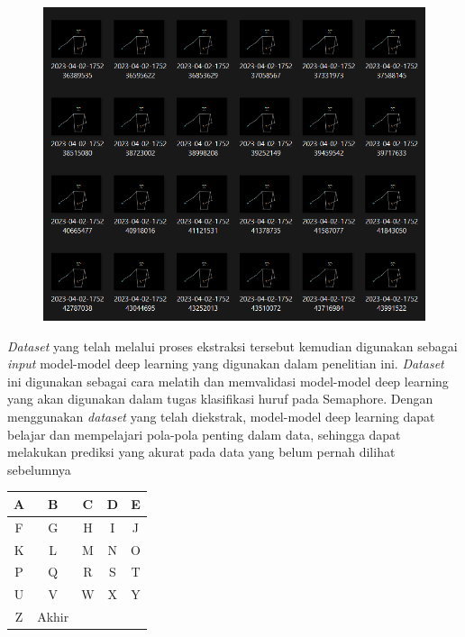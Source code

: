 \begin{figure}[!hbt]
	\centering
	\includegraphics[width=0.7\linewidth]{gambar/tugas-akhir-dawe.png}
	\label{fig:Datasetekstark}
\end{figure}

\textit{Dataset} yang telah melalui proses ekstraksi tersebut kemudian digunakan sebagai \textit{input}  model-model deep learning yang digunakan dalam penelitian ini. \textit{Dataset} ini digunakan sebagai cara melatih dan memvalidasi model-model deep learning yang akan digunakan dalam tugas klasifikasi huruf pada Semaphore. Dengan menggunakan \textit{dataset} yang telah diekstrak, model-model deep learning dapat belajar dan mempelajari pola-pola penting dalam data, sehingga dapat melakukan prediksi yang akurat pada data yang belum pernah dilihat sebelumnya

\begin{table}[htbp]
	\centering
	\label{tab:datasetlabel}
	\begin{tabular}{|c|c|c|c|c|}
		\hline
		A & B & C & D & E \\
		\hline
		F & G & H & I & J \\
		\hline
		K & L & M & N & O \\
		\hline
		P & Q & R & S & T \\
		\hline
		U & V & W & X & Y \\
		\hline
		Z &   Akhir &   &   &   \\
		\hline
	\end{tabular}
\end{table}

